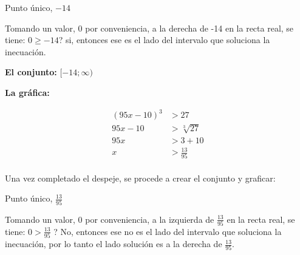     Punto único, $-14$

    Tomando un valor, 0 por conveniencia, a la derecha de -14 en la recta real,
    se tiene: $0\geq -14$? si, entonces ese es el lado del intervalo que
    soluciona la inecuación.


    \textbf{El conjunto:} $[-14; \infty)$

    \textbf{La gráfica:}

    \vspace*{1cm}



   \begin{align*}
       (95x -10)^3 &> 27		\\
       95x -10 &> \sqrt[3]{27} \\
       95x &> 3 +10\\
       x &> \frac{13}{95} \\
   \end{align*}

    Una vez completado el despeje, se procede a crear el conjunto y graficar:

    Punto único, $\displaystyle\frac{13}{95}$

    Tomando un valor, 0 por conveniencia, a la izquierda de $\displaystyle\frac{13}{95}$
    en la recta real,
    se tiene: $\displaystyle0 > \frac{13}{95} $ ? No, entonces ese no es el lado del intervalo que
    soluciona la inecuación, por lo tanto el lado solución es a la derecha de
    $\displaystyle\frac{13}{95}$.


